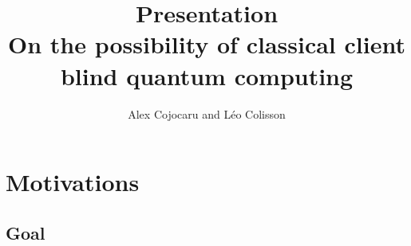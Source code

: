 \documentclass[]{beamer}
\title[Classically Driven Blind Quantum Computing]{Presentation\\On the possibility of classical client blind quantum computing}
\author{Alex Cojocaru and Léo Colisson}
\begin{document}

\begin{frame}
  \titlepage
\end{frame}

\begin{frame}
  \tableofcontents
\end{frame}


\section{Motivations}

\subsection{Goal}
\end{document}
